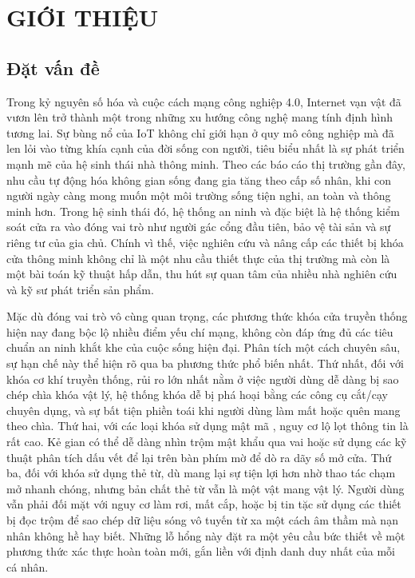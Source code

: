 \chapter{GIỚI THIỆU}

\section{Đặt vấn đề}

Trong kỷ nguyên số hóa và cuộc cách mạng công nghiệp 4.0, Internet vạn vật đã vươn lên trở thành một trong những xu hướng công nghệ mang tính định hình tương lai. Sự bùng nổ của IoT không chỉ giới hạn ở quy mô công nghiệp mà đã len lỏi vào từng khía cạnh của đời sống con người, tiêu biểu nhất là sự phát triển mạnh mẽ của hệ sinh thái nhà thông minh. Theo các báo cáo thị trường gần đây, nhu cầu tự động hóa không gian sống đang gia tăng theo cấp số nhân, khi con người ngày càng mong muốn một môi trường sống tiện nghi, an toàn và thông minh hơn. Trong hệ sinh thái đó, hệ thống an ninh và đặc biệt là hệ thống kiểm soát cửa ra vào đóng vai trò như người gác cổng đầu tiên, bảo vệ tài sản và sự riêng tư của gia chủ. Chính vì thế, việc nghiên cứu và nâng cấp các thiết bị khóa cửa thông minh không chỉ là một nhu cầu thiết thực của thị trường mà còn là một bài toán kỹ thuật hấp dẫn, thu hút sự quan tâm của nhiều nhà nghiên cứu và kỹ sư phát triển sản phẩm.

Mặc dù đóng vai trò vô cùng quan trọng, các phương thức khóa cửa truyền thống hiện nay đang bộc lộ nhiều điểm yếu chí mạng, không còn đáp ứng đủ các tiêu chuẩn an ninh khắt khe của cuộc sống hiện đại. Phân tích một cách chuyên sâu, sự hạn chế này thể hiện rõ qua ba phương thức phổ biến nhất. Thứ nhất, đối với khóa cơ khí truyền thống, rủi ro lớn nhất nằm ở việc người dùng dễ dàng bị sao chép chìa khóa vật lý, hệ thống khóa dễ bị phá hoại bằng các công cụ cắt/cạy chuyên dụng, và sự bất tiện phiền toái khi người dùng làm mất hoặc quên mang theo chìa. Thứ hai, với các loại khóa sử dụng mật mã , nguy cơ lộ lọt thông tin là rất cao. Kẻ gian có thể dễ dàng nhìn trộm mật khẩu qua vai hoặc sử dụng các kỹ thuật phân tích dấu vết để lại trên bàn phím mờ để dò ra dãy số mở cửa. Thứ ba, đối với khóa sử dụng thẻ từ, dù mang lại sự tiện lợi hơn nhờ thao tác chạm mở nhanh chóng, nhưng bản chất thẻ từ vẫn là một vật mang vật lý. Người dùng vẫn phải đối mặt với nguy cơ làm rơi, mất cắp, hoặc bị tin tặc sử dụng các thiết bị đọc trộm để sao chép dữ liệu sóng vô tuyến từ xa một cách âm thầm mà nạn nhân không hề hay biết. Những lỗ hổng này đặt ra một yêu cầu bức thiết về một phương thức xác thực hoàn toàn mới, gắn liền với định danh duy nhất của mỗi cá nhân.

